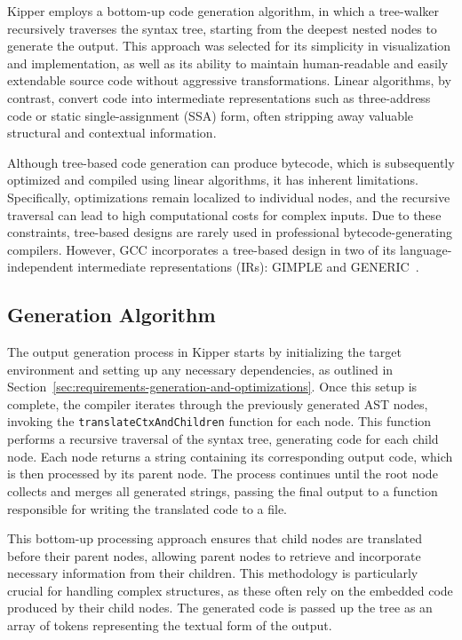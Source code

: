 Kipper employs a bottom-up code generation algorithm, in which a tree-walker recursively traverses the syntax tree, starting from the deepest nested nodes to generate the output. This approach was selected for its simplicity in visualization and implementation, as well as its ability to maintain human-readable and easily extendable source code without aggressive transformations. Linear algorithms, by contrast, convert code into intermediate representations such as three-address code or static single-assignment (SSA) form, often stripping away valuable structural and contextual information.

Although tree-based code generation can produce bytecode, which is subsequently optimized and compiled using linear algorithms, it has inherent limitations. Specifically, optimizations remain localized to individual nodes, and the recursive traversal can lead to high computational costs for complex inputs. Due to these constraints, tree-based designs are rarely used in professional bytecode-generating compilers. However, GCC incorporates a tree-based design in two of its language-independent intermediate representations (IRs): GIMPLE and GENERIC~\cite{gcc:gimpletuples}.

\subsection{Generation Algorithm}

The output generation process in Kipper starts by initializing the target environment and setting up any necessary dependencies, as outlined in Section~\ref{sec:requirements-generation-and-optimizations}. Once this setup is complete, the compiler iterates through the previously generated AST nodes, invoking the \lstinline|translateCtxAndChildren| function for each node. This function performs a recursive traversal of the syntax tree, generating code for each child node. Each node returns a string containing its corresponding output code, which is then processed by its parent node. The process continues until the root node collects and merges all generated strings, passing the final output to a function responsible for writing the translated code to a file.

This bottom-up processing approach ensures that child nodes are translated before their parent nodes, allowing parent nodes to retrieve and incorporate necessary information from their children. This methodology is particularly crucial for handling complex structures, as these often rely on the embedded code produced by their child nodes. The generated code is passed up the tree as an array of tokens representing the textual form of the output.

